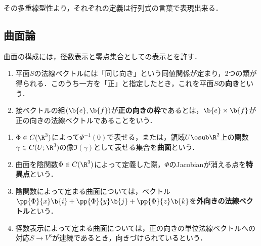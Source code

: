 \documentclass[uplatex,dvipdfmx]{jsreport}
\begin{document}
\begin{remarks}
    その多重線型性より，それぞれの定義は行列式の言葉で表現出来る．
\end{remarks}

\subsection{曲面論}

\begin{tcolorbox}[colframe=ForestGreen, colback=ForestGreen!10!white,breakable,colbacktitle=ForestGreen!40!white,coltitle=black,fonttitle=\bfseries\sffamily,
title=]
    曲面の構成には，径数表示と零点集合としての表示とを許す．
\end{tcolorbox}

\begin{definition}[平面の向き]\mbox{}
    \begin{enumerate}
        \item 平面$S$の法線ベクトルには「同じ向き」という同値関係が定まり，2つの類が得られる．このうち一方を「正」と指定したとき，これを平面$S$の\textbf{向き}という．
        \item 接ベクトルの組$(\b{e},\b{f})$が\textbf{正の向きの枠}であるとは，$\b{e}\times\b{f}$が正の向きの法線ベクトルであることをいう．
    \end{enumerate}
\end{definition}

\begin{definition}[曲面]\mbox{}
    \begin{enumerate}
        \item $\Phi\in C(\R^3)$によって$\Phi^{-1}(0)$で表せる，または，領域$U\osub\R^2$上の関数$\gamma\in C(U;\R^3)$の像$\Im(\gamma)$として表せる集合を\textbf{曲面}という．
        \item 曲面を陰関数$\Phi\in C(\R^3)$によって定義した際，$\Phi$のJacobianが消える点を\textbf{特異点}という．
        \item 陰関数によって定まる曲面については，ベクトル$\pp{\Phi}{x}\b{i}+\pp{\Phi}{y}\b{j}+\pp{\Phi}{z}\b{k}$を\textbf{外向きの法線ベクトル}という．
        \item 径数表示によって定まる曲面については，正の向きの単位法線ベクトルへの対応$S\to V^3$が連続であるとき，向きづけられているという．
    \end{enumerate}
\end{definition}
\end{document}
